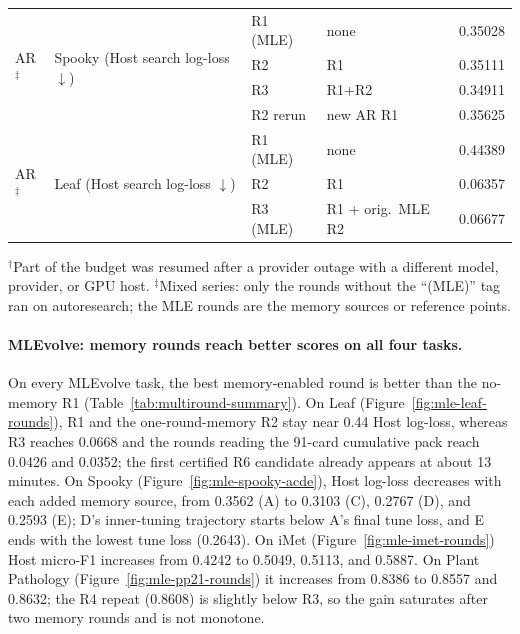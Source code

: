 \begin{table}[t]
\begin{tabular}{@{}lllll@{}}
    \midrule
    \multirow{4}{*}{AR$^\ddagger$} & \multirow{4}{*}{Spooky (Host search log-loss $\downarrow$)}
      & R1 (MLE) & none & 0.35028 \\
    & & R2 & R1 & 0.35111 \\
    & & R3 & R1+R2 & 0.34911 \\
    & & R2 rerun & new AR R1 & 0.35625 \\
    \midrule
    \multirow{3}{*}{AR$^\ddagger$} & \multirow{3}{*}{Leaf (Host search log-loss $\downarrow$)}
      & R1 (MLE) & none & 0.44389 \\
    & & R2 & R1 & 0.06357 \\
    & & R3 (MLE) & R1 + orig.\ MLE R2 & 0.06677 \\
    \bottomrule
  \end{tabular}

  \vspace{2pt}
  {\footnotesize $^\dagger$Part of the budget was resumed after a provider
  outage with a different model, provider, or GPU host.
  $^\ddagger$Mixed series: only the rounds without the ``(MLE)'' tag ran on
  autoresearch; the MLE rounds are the memory sources or reference points.}
\end{table}

\paragraph{MLEvolve: memory rounds reach better scores on all four tasks.}
On every MLEvolve task, the best memory-enabled round is better than the
no-memory R1 (Table~\ref{tab:multiround-summary}).  On Leaf
(Figure~\ref{fig:mle-leaf-rounds}), R1 and the one-round-memory R2 stay near
0.44 Host log-loss, whereas R3 reaches 0.0668 and the rounds reading the
91-card cumulative pack reach 0.0426 and 0.0352; the first certified R6
candidate already appears at about 13 minutes.  On Spooky
(Figure~\ref{fig:mle-spooky-acde}), Host log-loss decreases with each added
memory source, from 0.3562 (A) to 0.3103 (C), 0.2767 (D), and 0.2593 (E); D's inner-tuning trajectory starts below A's
final tune loss, and E ends with the lowest tune loss (0.2643).  On
iMet (Figure~\ref{fig:mle-imet-rounds}) Host micro-F1 increases from 0.4242 to
0.5049, 0.5113, and 0.5887.  On Plant Pathology
(Figure~\ref{fig:mle-pp21-rounds}) it increases from 0.8386 to 0.8557 and
0.8632; the R4 repeat (0.8608) is slightly below R3, so the gain saturates
after two memory rounds and is not monotone.

